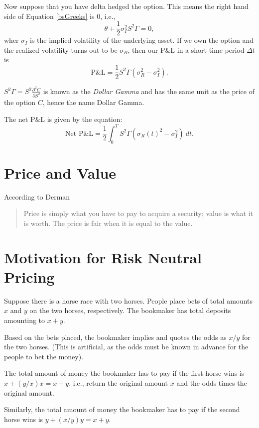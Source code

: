 \documentclass{amsart}
\theoremstyle{plain}
\numberwithin{equation}{section}
\begin{document}
Now suppose that you have delta hedged the 
option. This means the right hand side of Equation
\ref{bsGreeks} is $0$, i.e.,\
\begin{equation}
\theta + \frac{1}{2}
\sigma_{I}^2 S^2 \Gamma = 0,
\end{equation}
wher $\sigma_{I}$ is the implied
volatility of the underlying 
asset. If we own the option and the 
realized volatility turns out 
to be $\sigma_{R}$,
then our P\&L in a short time period
$\Delta t$ is 
\begin{equation}
\mbox{P\&L} = 
\frac{1}{2} S^2 \Gamma
\left(\sigma_{R}^2 - \sigma_{I}^2 \right).
\end{equation}

$S^2\Gamma = S^2 \frac{\partial^2 C}{\partial S^2}$ 
is known as the \emph{Dollar Gamma} and has the 
same unit as the price of the option $C$, hence 
the name Dollar Gamma.

The net P\&L is given by the equation:
\begin{equation}
\mbox{Net P\&L} = 
\frac{1}{2} 
\int_{0}^{T}
S^2 \Gamma
\left(\sigma_{R}(t)^2 - \sigma_{I}^2 \right) \:dt.
\end{equation}
\section{Price and Value}
According to Derman
\begin{quote}
Price is simply what you have to pay to acquire a 
security; value is what it is worth. The price is fair
when it is equal to the value.
\end{quote}

\section*{Motivation for Risk Neutral Pricing}
Suppose there is a horse race with two horses.
People place bets of total amounts $x$ and 
$y$ on the two horses, respectively. The bookmaker has 
total deposits amounting to $x+y$. 

Based on the bets placed, the bookmaker 
implies and quotes the odds as $x/y$ for the two horses.
(This is artificial, as the odds must be known in advance
for the people to bet the money).

The total amount of money the bookmaker has to pay 
if the first horse wins is 
$x + (y/x) x = x + y$, i.e., return the 
original amount $x$ and the odds times the original
amount.

Similarly, the total amount of money the bookmaker has to pay 
if the second horse wins is 
$y + (x/y) y = x + y$. 
\end{document}
